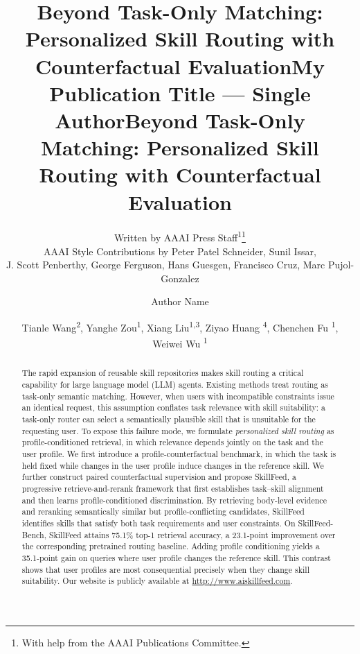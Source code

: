 \documentclass[letterpaper]{article} %
\title{Beyond Task-Only Matching: Personalized Skill Routing with Counterfactual Evaluation}
\author{
    Written by AAAI Press Staff\textsuperscript{\rm 1}\thanks{With help from the AAAI Publications Committee.}\\
    AAAI Style Contributions by Peter Patel Schneider,
    Sunil Issar,\\
    J. Scott Penberthy,
    George Ferguson,
    Hans Guesgen,
    Francisco Cruz\equalcontrib\corresponding,
    Marc Pujol-Gonzalez\equalcontrib\corresponding
}
\title{My Publication Title --- Single Author}
\author {
    Author Name
}
\title{Beyond Task-Only Matching: Personalized Skill Routing with Counterfactual Evaluation}
\author {
    Tianle Wang\textsuperscript{\rm 2}\equalcontrib,
    Yanghe Zou\textsuperscript{\rm 1}\equalcontrib,
    Xiang Liu\textsuperscript{\rm 1,\rm 3},
    Ziyao Huang \textsuperscript{\rm 4},
    Chenchen Fu \textsuperscript{\rm 1},
    Weiwei Wu \textsuperscript{\rm 1}
}
\begin{document}
\maketitle

\begin{abstract}
The rapid expansion of reusable skill repositories makes skill routing a critical capability for large language model (LLM) agents. Existing methods treat routing as task-only semantic matching.
However, when users with incompatible constraints issue an identical request, this assumption conflates task relevance with skill suitability: a task-only router can select a semantically plausible skill that is unsuitable for the requesting user. 
To expose this failure mode, we formulate \textit{personalized skill routing} as profile-conditioned retrieval, in which relevance depends jointly on the task and the user profile. We first introduce a profile-counterfactual benchmark, in which the task is held fixed while changes in the user profile induce changes in the reference skill. We further construct paired counterfactual supervision and propose SkillFeed, a progressive retrieve-and-rerank framework that first establishes task--skill alignment and then learns profile-conditioned discrimination. By retrieving body-level evidence and reranking semantically similar but profile-conflicting candidates, SkillFeed identifies skills that satisfy both task requirements and user constraints. 
On SkillFeed-Bench, SkillFeed attains 75.1\% top-1 retrieval accuracy, a 23.1-point improvement over the corresponding pretrained routing baseline. Adding profile conditioning yields a 35.1-point gain on queries where user profile changes the reference skill. This contrast shows that user profiles are most consequential precisely when they change skill suitability. Our website is publicly available at \url{http://www.aiskillfeed.com}.
\end{abstract}
\end{document}
